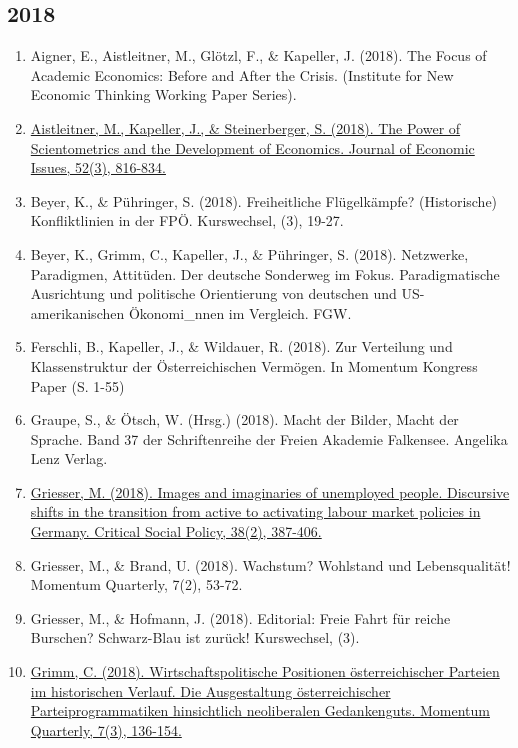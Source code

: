 \subsection*{2018}
\begin{enumerate}
	 \item Aigner, E., Aistleitner, M., Glötzl, F., \& Kapeller, J. (2018). The Focus of Academic Economics: Before and After the Crisis. (Institute for New Economic Thinking Working Paper Series).
	 \item \href{https://doi.org/10.1080/00213624.2018.1498721}{Aistleitner, M., Kapeller, J., \& Steinerberger, S. (2018). The Power of Scientometrics and the Development of Economics. Journal of Economic Issues, 52(3), 816-834.}
	 \item Beyer, K., \& Pühringer, S. (2018). Freiheitliche Flügelkämpfe? (Historische) Konfliktlinien in der FPÖ. Kurswechsel, (3), 19-27.
	 \item Beyer, K., Grimm, C., Kapeller, J., \& Pühringer, S. (2018). Netzwerke, Paradigmen, Attitüden. Der deutsche Sonderweg im Fokus. Paradigmatische Ausrichtung und politische Orientierung von deutschen und US-amerikanischen Ökonomi\_nnen im Vergleich. FGW.
	 \item Ferschli, B., Kapeller, J., \& Wildauer, R. (2018). Zur Verteilung und Klassenstruktur der Österreichischen Vermögen. In Momentum Kongress Paper (S. 1-55)
	 \item Graupe, S., \& Ötsch, W. (Hrsg.) (2018). Macht der Bilder, Macht der Sprache. Band 37 der Schriftenreihe der Freien Akademie Falkensee. Angelika Lenz Verlag.
	 \item \href{https://doi.org/10.1177/0261018317727481}{Griesser, M. (2018). Images and imaginaries of unemployed people. Discursive shifts in the transition from active to activating labour market policies in Germany. Critical Social Policy, 38(2), 387-406.}
	 \item Griesser, M., \& Brand, U. (2018). Wachstum? Wohlstand und Lebensqualität! Momentum Quarterly, 7(2), 53-72.
	 \item Griesser, M., \& Hofmann, J. (2018). Editorial: Freie Fahrt für reiche Burschen? Schwarz-Blau ist zurück! Kurswechsel, (3).
	 \item \href{https://doi.org/10.15203/momentumquarterly.vol7.no3.p136-154}{Grimm, C. (2018). Wirtschaftspolitische Positionen österreichischer Parteien im historischen Verlauf. Die Ausgestaltung österreichischer Parteiprogrammatiken hinsichtlich neoliberalen Gedankenguts. Momentum Quarterly, 7(3), 136-154.}

\end{enumerate}
